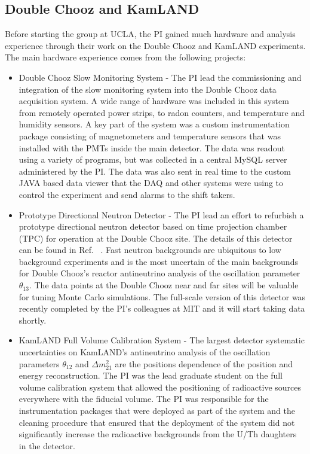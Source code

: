 \subsection{Double Chooz and KamLAND}
Before starting the group at UCLA, the PI gained much hardware and analysis experience through their work on the Double Chooz and KamLAND experiments.
The main hardware experience comes from the following projects:
\begin{itemize}
  \item Double Chooz Slow Monitoring System - The PI lead the commissioning and integration of the slow monitoring system into the Double Chooz data acquisition system. A wide range of hardware was included in this system from remotely operated power strips, to radon counters, and temperature and humidity sensors. A key part of the system was a custom instrumentation package consisting of magnetometers and temperature sensors that was installed with the PMTs inside the main detector. The data was readout using a variety of programs, but was collected in a central MySQL server administered by the PI. The data was also sent in real time to the custom JAVA based data viewer that the DAQ and other systems were using to control the experiment and send alarms to the shift takers. 
  \item Prototype Directional Neutron Detector - The PI lead an effort to refurbish a prototype directional neutron detector based on time projection chamber (TPC) for operation at the Double Chooz site. The details of this detector can be found in Ref.~ \cite{Lopez201222}. Fast neutron backgrounds are ubiquitous to low background experiments and is the most uncertain of the main backgrounds for Double Chooz's reactor antineutrino analysis of the oscillation parameter $\theta_{13}$\cite{dcone,dctwo,dchydrogen}. The data points at the Double Chooz near and far sites will be valuable for tuning Monte Carlo simulations. The full-scale version of this detector was recently completed by the PI's colleagues at MIT and it will start taking data shortly.  
  \item KamLAND Full Volume Calibration System - The largest detector systematic uncertainties on KamLAND's antineutrino analysis of the oscillation parameters $\theta_{12}$ and $\Delta m_{21}^{2}$ are the positions dependence of the position and energy reconstruction\cite{Eguchi:2002dm,Araki:2004mb,Abe:2008aa,Gando:2010aa}. The PI was the lead graduate student on the full volume calibration system that allowed the positioning of radioactive sources everywhere with the fiducial volume\cite{fourpi}. The PI was responsible for the instrumentation packages that were deployed as part of the system and the cleaning procedure that ensured that the deployment of the system did not significantly increase the radioactive backgrounds from the U/Th daughters in the detector. 
\end{itemize}

